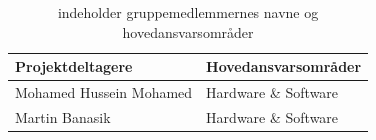 \begin{table}[H]
\centering

\begin{tabular}{|l|l|}
\hline
\textbf{Projektdeltagere}        & \textbf{Hovedansvarsområder}  \\ \hline
Mohamed Hussein Mohamed & Hardware \& Software \\ \hline
Martin Banasik          & Hardware \& Software \\ \hline


\end{tabular}

\caption{indeholder gruppemedlemmernes navne og hovedansvarsområder }
\label{Ansvarsfordeling}
\end{table}


